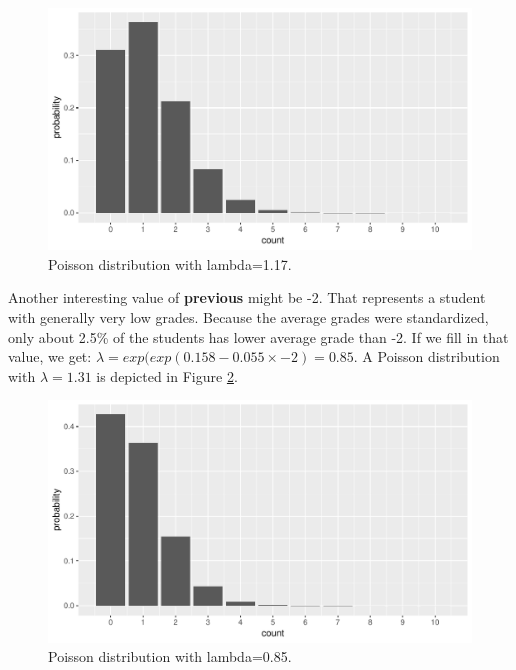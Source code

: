 \documentclass[]{book}\usepackage[]{graphicx}\usepackage[]{color}
\makeatletter
\def\maxwidth{ %
  \ifdim\Gin@nat@width>\linewidth
    \linewidth
  \else
    \Gin@nat@width
  \fi
}
\newenvironment{knitrout}{}{} %
\makeatother
\begin{document}
\begin{knitrout}
\color{fgcolor}\begin{figure}

{\centering \includegraphics[width=\maxwidth]{figure/gen_16-1} 

}

\caption[Poisson distribution with lambda=1.17]{Poisson distribution with lambda=1.17.}\label{fig:gen_16}
\end{figure}


\end{knitrout}

Another interesting value of \textbf{previous} might be -2. That represents a student with generally very low grades. Because the average grades were standardized, only about 2.5\% of the students has lower average grade than -2. If we fill in that value, we get: $\lambda=exp(exp(0.158  -0.055 \times -2)= 0.85$. A Poisson distribution with $\lambda=1.31$ is depicted in Figure \ref{fig:gen_17}.

\begin{knitrout}
\color{fgcolor}\begin{figure}

{\centering \includegraphics[width=\maxwidth]{figure/gen_17-1} 

}

\caption[Poisson distribution with lambda=0.85]{Poisson distribution with lambda=0.85.}\label{fig:gen_17}
\end{figure}


\end{knitrout}
\end{document}
